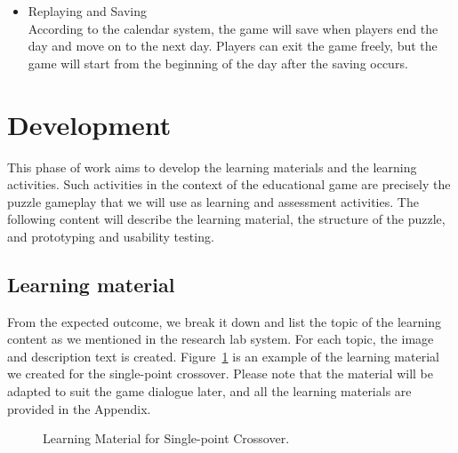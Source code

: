 \documentclass[12pt,oneside,openright,a4paper]{cpe-english-project}
\begin{document}
\begin{itemize}
\item Replaying and Saving \\
According to the calendar system, the game will save when players end the day and move on to the next day. Players can exit the game freely, but the game will start from the beginning of the day after the saving occurs.
\end{itemize}


\section{Development}
This phase of work aims to develop the learning materials and the learning activities. Such activities in the context of the educational game are precisely the puzzle gameplay that we will use as learning and assessment activities. The following content will describe the learning material, the structure of the puzzle, and prototyping and usability testing.

\subsection{Learning material}
From the expected outcome, we break it down and list the topic of the learning content as we mentioned in the research lab system. For each topic, the image and description text is created. Figure~\ref{fig:develop-learning-material-SPC} is an example of the learning material we created for the single-point crossover. Please note that the material will be adapted to suit the game dialogue later, and all the learning materials are provided in the Appendix. %

\begin{figure}[!h]\centering
{}
\caption{Learning Material for Single-point Crossover.}
\label{fig:develop-learning-material-SPC}
\end{figure}
\end{document}
